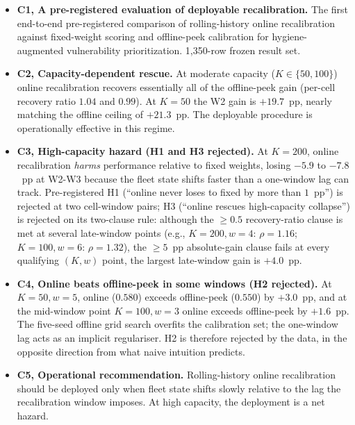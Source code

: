 \begin{itemize}
\item \textbf{C1, A pre-registered evaluation of deployable
recalibration.} The first end-to-end pre-registered comparison of
rolling-history online recalibration against fixed-weight scoring and
offline-peek calibration for hygiene-augmented vulnerability
prioritization. 1{,}350-row frozen result set.

\item \textbf{C2, Capacity-dependent rescue.} At moderate capacity
($K \in \{50, 100\}$) online recalibration recovers essentially all of
the offline-peek gain (per-cell recovery ratio $1.04$ and $0.99$). At
$K = 50$ the W2 gain is $+19.7$~pp, nearly matching the offline ceiling
of $+21.3$~pp. The deployable procedure is operationally effective in
this regime.

\item \textbf{C3, High-capacity hazard (H1 and H3 rejected).} At
$K = 200$, online recalibration \textit{harms} performance relative
to fixed weights, losing $-5.9$ to $-7.8$~pp at W2-W3 because the
fleet state shifts faster than a one-window lag can track. Pre-registered
H1 (``online never loses to fixed by more than $1$~pp'') is rejected at
two cell-window pairs; H3 (``online rescues high-capacity collapse'')
is rejected on its two-clause rule: although the $\geq 0.5$
recovery-ratio clause is met at several late-window points (e.g.,
$K = 200, w = 4$: $\rho = 1.16$; $K = 100, w = 6$: $\rho = 1.32$),
the $\geq 5$~pp absolute-gain clause fails at every qualifying
$(K, w)$ point, the largest late-window gain is $+4.0$~pp.

\item \textbf{C4, Online beats offline-peek in some windows (H2
rejected).} At $K = 50, w = 5$, online ($0.580$) exceeds offline-peek
($0.550$) by $+3.0$~pp, and at the mid-window point $K = 100, w = 3$
online exceeds offline-peek by $+1.6$~pp. The five-seed
offline grid search overfits the calibration set; the one-window
lag acts as an implicit regulariser. H2 is therefore rejected by
the data, in the opposite direction from what naive intuition
predicts.

\item \textbf{C5, Operational recommendation.} Rolling-history
online recalibration should be deployed only when fleet state shifts
slowly relative to the lag the recalibration window imposes. At high
capacity, the deployment is a net hazard.
\end{itemize}

